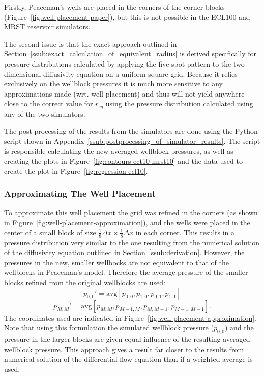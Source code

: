 Firstly, Peaceman's wells are placed in the corners of the corner blocks (Figure~\ref{fig:well-placement-paper}), but this is not possible in the ECL100 and MRST reservoir simulators.

The second issue is that the exact approach outlined in Section~\ref{ssub:exact_calculation_of_equivalent_radius} is derived specifically for pressure distributions calculated by applying the five-spot pattern to the two-dimensional diffusivity equation on a uniform square grid. Because it relies exclusively on the wellblock pressures it is much more sensitive to any approximations made (wrt. well placement) and thus will not yield anywhere close to the correct value for $r_{eq}$ using the pressure distribution calculated using any of the two simulators.

The post-processing of the results from the simulators are done using the Python script shown in Appendix~\ref{ssub:postprocessing_of_simulator_results}. The script is responsible calculating the new averaged wellblock pressures, as well as creating the plots in Figure~\ref{fig:contours-ect10-mrst10} and the data used to create the plot in Figure~\ref{fig:regression-ecl10}.

\subsubsection{Approximating The Well Placement} %
\label{ssub:approximating_the_well_placement}

To approximate this well placement the grid was refined in the corners (as shown in Figure~\ref{fig:well-placement-approximation}), and the wells were placed in the center of a small block of size $\frac{1}{8}\Delta x\times \frac{1}{8}\Delta x$ in each corner. This results in a pressure distribution very similar to the one resulting from the numerical solution of the diffusivity equation outlined in Section~\ref{ssub:derivation}. However, the pressures in the new, smaller wellbocks are not equivalent to that of the wellblocks in Peaceman's model. Therefore the average pressure of the smaller blocks refined from the original wellblocks are used:
\begin{equation}
    p_{0,0}' = \mathrm{avg}\left[ p_{0,0}, p_{1,0}, p_{0,1}, p_{1,1} \right]
\end{equation}
\begin{equation}
    p_{M,M}' = \mathrm{avg}\left[ p_{M,M}, p_{M-1,M}, p_{M,M-1}, p_{M-1,M-1} \right].
\end{equation}
The coordinates used are indicated in Figure~\ref{fig:well-placement-approximation}. Note that using this formulation the simulated wellblock pressure ($p_{0,0}$) and the pressure in the larger blocks are given equal influence of the resulting averaged wellblock pressure. This approach gives a result far closer to the results from numerical solution of the differential flow equation than if a weighted average is used.

